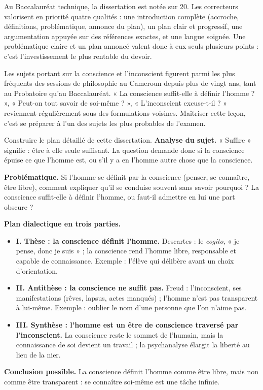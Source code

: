 \documentclass[11pt]{article}
\newcounter{popsec}
\newcounter{popsub}
\newcommand{\courssub}[1]{%
  \stepcounter{popsub}%
  \par\vspace{9pt}\noindent{\popxbold\fontsize{11.5}{13}\selectfont\color{popink}{\color{poporange}\thepopsec.\thepopsub}\hspace{6pt}#1}\par\nopagebreak\vspace{4pt}
}
\begin{document}
\begin{exemplebox}
Au Baccalauréat technique, la dissertation est notée sur 20. Les correcteurs valorisent en priorité quatre qualités : une introduction complète (accroche, définitions, problématique, annonce du plan), un plan clair et progressif, une argumentation appuyée sur des références exactes, et une langue soignée. Une problématique claire et un plan annoncé valent donc à eux seuls plusieurs points : c'est l'investissement le plus rentable du devoir.
\end{exemplebox}

\begin{savaistu}
Les sujets portant sur la conscience et l'inconscient figurent parmi les plus fréquents des sessions de philosophie au Cameroun depuis plus de vingt ans, tant au Probatoire qu'au Baccalauréat. « La conscience suffit-elle à définir l'homme ? », « Peut-on tout savoir de soi-même ? », « L'inconscient excuse-t-il ? » reviennent régulièrement sous des formulations voisines. Maîtriser cette leçon, c'est se préparer à l'un des sujets les plus probables de l'examen.
\end{savaistu}

\courssub{Sujet type 1 : construction guidée du plan}

\begin{exoresolu}
Construire le plan détaillé de cette dissertation.
\tcblower
\textbf{Analyse du sujet.} « Suffire » signifie : être à elle seule suffisant. La question demande donc si la conscience épuise ce que l'homme est, ou s'il y a en l'homme autre chose que la conscience.

\textbf{Problématique.} Si l'homme se définit par la conscience (penser, se connaître, être libre), comment expliquer qu'il se conduise souvent sans savoir pourquoi ? La conscience suffit-elle à définir l'homme, ou faut-il admettre en lui une part obscure ?

\textbf{Plan dialectique en trois parties.}
\begin{itemize}
\item \textbf{I. Thèse : la conscience définit l'homme.} Descartes : le \emph{cogito}, « je pense, donc je suis » ; la conscience rend l'homme libre, responsable et capable de connaissance. Exemple : l'élève qui délibère avant un choix d'orientation.
\item \textbf{II. Antithèse : la conscience ne suffit pas.} Freud : l'inconscient, ses manifestations (rêves, lapsus, actes manqués) ; l'homme n'est pas transparent à lui-même. Exemple : oublier le nom d'une personne que l'on n'aime pas.
\item \textbf{III. Synthèse : l'homme est un être de conscience traversé par l'inconscient.} La conscience reste le sommet de l'humain, mais la connaissance de soi devient un travail ; la psychanalyse élargit la liberté au lieu de la nier.
\end{itemize}
\textbf{Conclusion possible.} La conscience définit l'homme comme être libre, mais non comme être transparent : se connaître soi-même est une tâche infinie.
\end{exoresolu}
\end{document}

